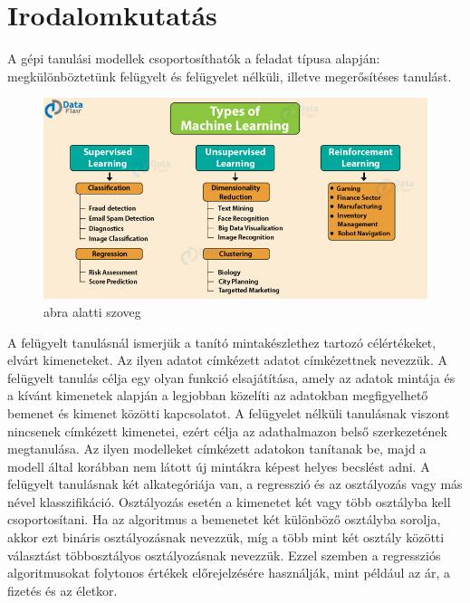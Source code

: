 \section{Irodalomkutatás}
\label{sec:irodalom}



A gépi tanulási modellek csoportosíthatók a feladat típusa alapján: megkülönböztetünk felügyelt és felügyelet nélküli, illetve megerősítéses tanulást.

\begin{figure}[h]
	\centering
	\includegraphics[width=1\columnwidth]{figures/machine_learning_types.png}
	\caption{abra alatti szoveg}
\end{figure}

A felügyelt tanulásnál ismerjük a tanító mintakészlethez tartozó célértékeket, elvárt kimeneteket. Az ilyen adatot címkézett adatot címkézettnek nevezzük. A felügyelt tanulás célja egy olyan funkció elsajátítása, amely az adatok mintája és a kívánt kimenetek alapján a legjobban közelíti az adatokban megfigyelhető bemenet és kimenet közötti kapcsolatot. A felügyelet nélküli tanulásnak viszont nincsenek címkézett kimenetei, ezért célja az adathalmazon belső szerkezetének megtanulása. Az ilyen modelleket címkézett adatokon tanítanak be, majd a modell által korábban nem látott új mintákra képest helyes becslést adni. A felügyelt tanulásnak két alkategóriája van, a regresszió és az osztályozás vagy más nével klasszifikáció. Osztályozás esetén a kimenetet két vagy több osztályba kell csoportosítani. Ha az algoritmus a bemenetet két különböző osztályba sorolja, akkor ezt bináris osztályozásnak nevezzük, míg a több mint két osztály közötti választást többosztályos osztályozásnak nevezzük. Ezzel szemben a regressziós algoritmusokat folytonos értékek előrejelzésére használják, mint például az ár, a fizetés és az életkor.
 
